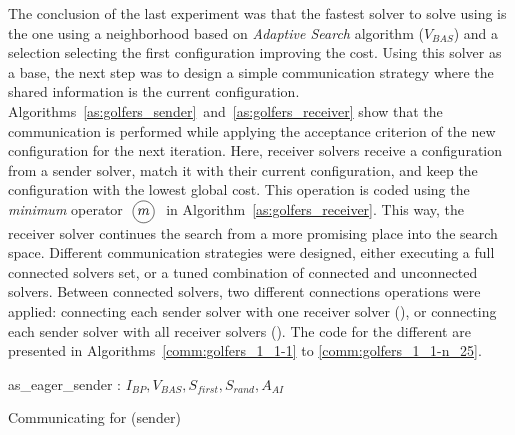 \separation

The conclusion of the last experiment was that the fastest solver to solve \SGP{} using \posl{} is the one using a neighborhood \om{} based on {\it Adaptive Search} algorithm ($V_{BAS}$) and a selection \om{} selecting the first configuration improving the cost. Using this solver as a base, the next step was to design a simple communication strategy where the shared information is the current configuration. Algorithms~\ref{as:golfers_sender}~and~\ref{as:golfers_receiver} show that the communication is performed while applying the acceptance criterion of the new configuration for the next iteration. Here, receiver solvers receive a configuration from a sender solver, match it with their current configuration, and keep the configuration with the lowest global cost. This operation is coded using the \textit{minimum} operator $\poslop{m}$ in Algorithm~\ref{as:golfers_receiver}. This way, the receiver solver continues the search from a more promising place into the search space. Different communication strategies were designed, either executing a full connected solvers set, or a tuned combination of connected and unconnected solvers. Between connected solvers, two different connections operations were applied: connecting each sender solver with one receiver solver (\oneTone), or connecting each sender solver with all receiver solvers (\oneTn). The code for the different \commstrs{} are presented in Algorithms~\ref{comm:golfers_1_1-1} to \ref{comm:golfers_1_1-n_25}. 

\begin{algorithm}
\dontprintsemicolon
\SetNoline
{}
   as\_eager\_sender\;
\algoindent {} : $I_{BP}, V_{BAS}, S_{first}, S_{rand}, A_{AI}$ \;
\caption{Communicating \as{} for \SGP{} (sender)}\label{as:golfers_sender}
\end{algorithm}

